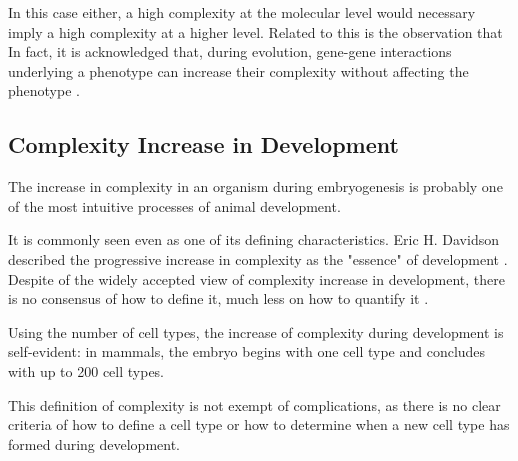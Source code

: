 In this case either, a high complexity at the molecular level would necessary imply a high complexity at a higher level. 
Related to this is the observation that 
In fact, it is acknowledged that, during evolution, gene-gene interactions underlying a phenotype
can increase their complexity without affecting the phenotype 
	\citep{Muller1999,True2001,Salazar-Ciudad2009}.


\subsection{Complexity Increase in Development}

The increase in complexity in an organism during embryogenesis is probably one of the most intuitive processes of animal development.

It is commonly seen even as one of its defining characteristics.
Eric H. Davidson described the progressive increase in complexity as the "essence" of development \citep{Davidson2001}. Despite of the widely accepted view of complexity increase in development, there is no consensus of how to define it, much less on how to quantify it \citep{susan2000ontogeny}.


Using the number of cell types, the increase of complexity during development is self-evident: in mammals, the embryo begins with one cell type and concludes with up to 200 cell types. 


This definition of complexity is not exempt of complications, as there is no clear criteria of how to define a cell type or how to determine when a new cell type has formed during development. 
 
